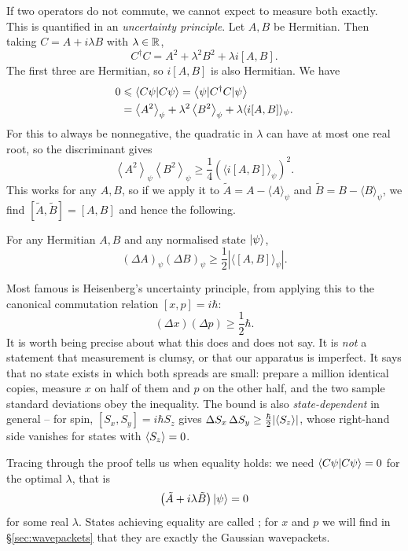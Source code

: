 \documentclass[a4paper]{scrartcl}
\begin{document}
If two operators do not commute, we cannot expect to measure both exactly. This is quantified in an \emph{uncertainty principle}. Let $A, B$ be Hermitian. Then taking $C = A + i\lambda B$ with $\lambda \in \mathbb{R}$,
$$
C^{\dagger} C=A^2+\lambda^2 B^2+\lambda i[A, B] .
$$
The first three are Hermitian, so $i[A, B]$ is also Hermitian. We have
$$
\begin{aligned}
0 & \leqslant \braket{C \psi}{C \psi}=\left\langle\psi\lvert C^{\dagger} C \rvert \psi\right\rangle \\
& =\left\langle A^2\right\rangle_\psi+\lambda^2\left\langle B^2\right\rangle_\psi+\lambda\langle i[A, B]\rangle_\psi .
\end{aligned}
$$
For this to always be nonnegative, the quadratic in $\lambda$ can have at most one real root, so the discriminant gives
$$
\left\langle A^2\right\rangle_\psi\left\langle B^2\right\rangle_\psi \geqslant \frac{1}{4}\left(\langle i[A, B]\rangle_\psi\right)^2 .
$$
This works for any $A, B$, so if we apply it to $\tilde{A}=A-\langle A\rangle_\psi$ and $\tilde{B}=B-\langle B\rangle_\psi$, we find $[\tilde{A}, \tilde{B}]=[A, B]$ and hence the following.

\begin{theorem}
    For any Hermitian $A, B$ and any normalised state $\ket{\psi}$,
    $$
    (\Delta A)_\psi(\Delta B)_\psi \geqslant \frac{1}{2}\left|\langle[A, B]\rangle_\psi\right| .
    $$
\end{theorem}

Most famous is Heisenberg's uncertainty principle, from applying this to the canonical commutation relation $[x, p] = i\hbar$:
$$
(\Delta x)(\Delta p) \geqslant \frac{1}{2} \hbar .
$$
It is worth being precise about what this does and does not say. It is \emph{not} a statement that measurement is clumsy, or that our apparatus is imperfect. It says that no state exists in which both spreads are small: prepare a million identical copies, measure $x$ on half of them and $p$ on the other half, and the two sample standard deviations obey the inequality. The bound is also \emph{state-dependent} in general -- for spin, $[S_x, S_y] = i\hbar S_z$ gives $\Delta S_x \, \Delta S_y \geq \frac{\hbar}{2}\lvert\expval{S_z}\rvert$, whose right-hand side vanishes for states with $\expval{S_z} = 0$.

Tracing through the proof tells us when equality holds: we need $\braket{C\psi}{C\psi} = 0$ for the optimal $\lambda$, that is
$$
\left( \tilde A + i \lambda \tilde B \right)\ket{\psi} = 0
$$
for some real $\lambda$. States achieving equality are called ; for $x$ and $p$ we will find in \S\ref{sec:wavepackets} that they are exactly the Gaussian wavepackets.
\end{document}
